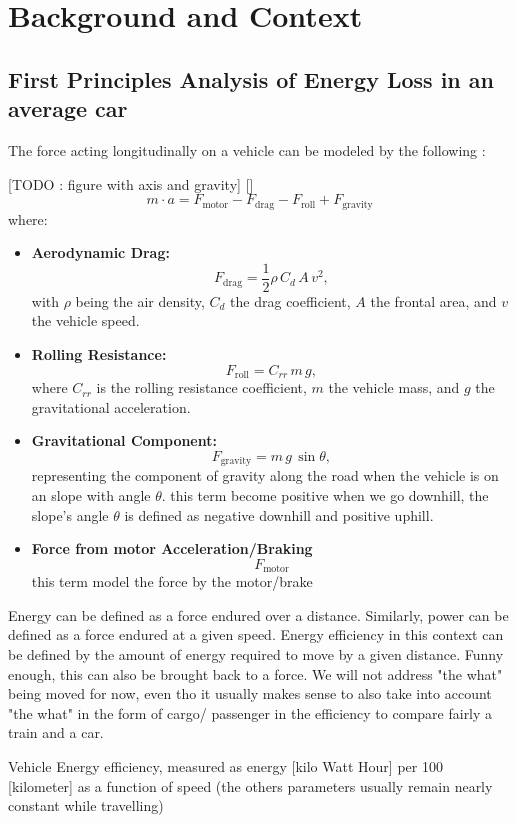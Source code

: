 \section{Background and Context}

\subsection{First Principles Analysis of Energy Loss in an average car}
The force acting longitudinally on a vehicle can be modeled by the following : 

[TODO : figure with axis and gravity]
[]
\[
m\cdot a = F_{\text{motor}} - F_{\text{drag}} - F_{\text{roll}} + F_{\text{gravity}}
\]
where:
\begin{itemize}
    \item \textbf{Aerodynamic Drag:} 
    \[
    F_{\text{drag}} = \frac{1}{2} \rho\, C_d\, A\, v^2,
    \]
    with \(\rho\) being the air density, \(C_d\) the drag coefficient, \(A\) the frontal area, and \(v\) the vehicle speed.
    \item \textbf{Rolling Resistance:} 
    \[
    F_{\text{roll}} = C_{rr}\, m\, g,
    \]
    where \(C_{rr}\) is the rolling resistance coefficient, \(m\) the vehicle mass, and \(g\) the gravitational acceleration.
    \item \textbf{Gravitational Component:} 
    \[
    F_{\text{gravity}} = m\, g\, \sin\theta,
    \]
    representing the component of gravity along the road when the vehicle is on an slope with angle \(\theta\). this term become positive when we go downhill, the slope's angle $\theta$ is defined as negative downhill and positive uphill.
    \item \textbf{Force from motor Acceleration/Braking} 
    \[
    F_{\text{motor}}
    \]
    this term model the force by the motor/brake
\end{itemize}

Energy can be defined as a force endured over a distance. Similarly, power can be defined as a force endured at a given speed. Energy efficiency in this context can be defined by the amount of energy required to move by a given distance. Funny enough, this can also be brought back to a force. We will not address "the what" being moved for now, even tho it usually makes sense to also take into account "the what" in the form of cargo/ passenger in the efficiency to compare fairly a train and a car.

Vehicle Energy efficiency, measured as energy [kilo Watt Hour] per 100 [kilometer] as a function of speed (the others parameters usually remain nearly constant while travelling)

